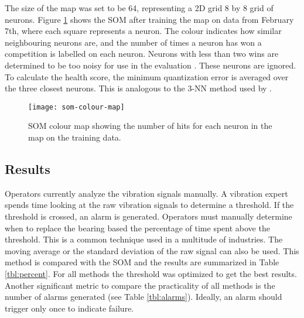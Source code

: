 The size of the map was set to be 64, representing a 2D grid 8 by 8 grid of neurons.
Figure \ref{fig:colourmap} shows the SOM after training the map on data from February 7th, where each square represents a neuron. 
The colour indicates how similar neighbouring neurons are, and the number of times a neuron has won a competition is labelled on each neuron.
Neurons with less than two wins are determined to be too noisy for use in the evaluation \cite{som-1}.
These neurons are ignored.
To calculate the health score, the minimum quantization error is averaged over the three closest neurons.
This is analogous to the 3-NN method used by \cite{Tian2014AnomalyDU}.

\begin{figure}[!h]
    \centering
    \texttt{[image: som-colour-map]}
    \caption{SOM colour map showing the number of hits for each neuron in the map on the training data.}
    \label{fig:colourmap}
\end{figure}

\subsection{Results}

Operators currently analyze the vibration signals manually.
A vibration expert spends time looking at the raw vibration signals to determine a threshold.
If the threshold is crossed, an alarm is generated.
Operators must manually determine when to replace the bearing based the percentage of time spent above the threshold.
This is a common technique used in a multitude of industries.
The moving average or the standard deviation of the raw signal can also be used.
This method is compared with the SOM and the results are summarized in Table \ref{tbl:percent}.
For all methods the threshold was optimized to get the best results.
Another significant metric to compare the practicality of all methods is the number of alarms generated (see Table \ref{tbl:alarms}).
Ideally, an alarm should trigger only once to indicate failure.

